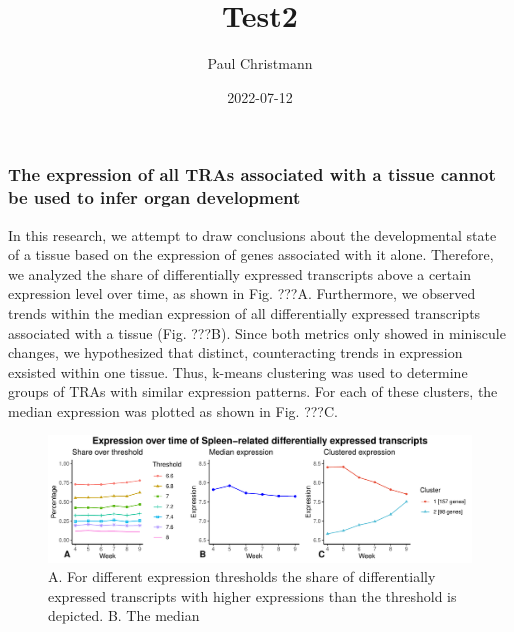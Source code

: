 \documentclass[
]{article}
\title{Test2}
\author{Paul Christmann}
\date{2022-07-12}
\begin{document}
\maketitle

\hypertarget{the-expression-of-all-tras-associated-with-a-tissue-cannot-be-used-to-infer-organ-development}{%
\subsubsection{The expression of all TRAs associated with a tissue
cannot be used to infer organ
development}\label{the-expression-of-all-tras-associated-with-a-tissue-cannot-be-used-to-infer-organ-development}}

In this research, we attempt to draw conclusions about the developmental
state of a tissue based on the expression of genes associated with it
alone. Therefore, we analyzed the share of differentially expressed
transcripts above a certain expression level over time, as shown in Fig.
???A. Furthermore, we observed trends within the median expression of
all differentially expressed transcripts associated with a tissue (Fig.
???B). Since both metrics only showed in miniscule changes, we
hypothesized that distinct, counteracting trends in expression exsisted
within one tissue. Thus, k-means clustering was used to determine groups
of TRAs with similar expression patterns. For each of these clusters,
the median expression was plotted as shown in Fig. ???C.

\begin{figure}
\centering
\includegraphics{Test2_files/figure-latex/unnamed-chunk-5-1.pdf}
\caption{A. For different expression thresholds the share of
differentially expressed transcripts with higher expressions than the
threshold is depicted. B. The median}
\end{figure}
\end{document}

